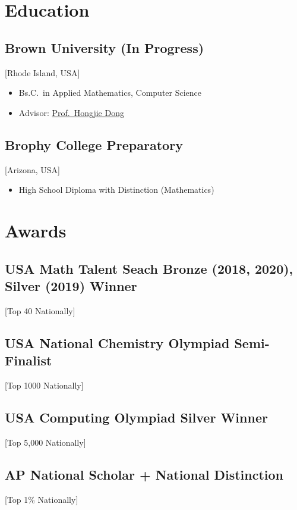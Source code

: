 \documentclass{mycv}
\begin{document}
\section{Education}

\subsection{Brown University (In Progress)}[Rhode Island, USA]
\vspace{-\parskip}%
\begin{itemize}[label={}]
  \item Bs.C.\ in Applied Mathematics, Computer Science 
  \item Advisor: \href{https://www.dam.brown.edu/people/hdong/}{Prof.~Hongjie Dong}
\end{itemize}

\subsection{Brophy College Preparatory}[Arizona, USA]
\vspace{-\parskip}%
\begin{itemize}[label={}]
  \item High School Diploma with Distinction (Mathematics) 
\end{itemize}

\section{Awards}
\subsection{USA Math Talent Seach Bronze (2018, 2020), Silver (2019) Winner}[Top 40 Nationally]

\subsection{USA National Chemistry Olympiad Semi-Finalist}[Top 1000 Nationally]

\subsection{USA Computing Olympiad Silver Winner}[Top 5,000 Nationally]

\subsection{AP National Scholar + National Distinction}[Top 1\% Nationally]
\end{document}
